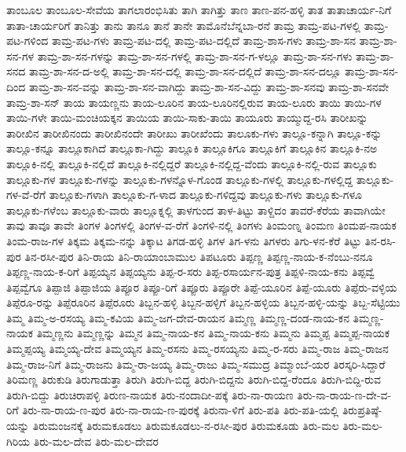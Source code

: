 {ತಾಂಬೂಲ
ತಾಂಬೂಲ-ಸೇವೆಯ
ತಾಗಲಾರಂಭಿಸಿತು
ತಾಗಿ
ತಾಗಿತ್ತು
ತಾಣ
ತಾಣ-ಪನ-ಹಳ್ಳಿ
ತಾತ
ತಾತಾಚಾರ್ಯ-ನಿಗೆ
ತಾತಾ-ಚಾರ್ಯರಿಗೆ
ತಾನಿತ್ತು
ತಾನು
ತಾನೂ
ತಾನೆ
ತಾನೇ
ತಾಮೊನೆಬೆನ್ನಬಾ-ರನೆ
ತಾಮ್ರ
ತಾಮ್ರ-ಪಟ-ಗಳಲ್ಲಿ
ತಾಮ್ರ-ಪಟ-ಗಳಿಂದ
ತಾಮ್ರ-ಪಟ-ಗಳು
ತಾಮ್ರ-ಪಟ-ದಲ್ಲಿ
ತಾಮ್ರ-ಪಟ-ದಲ್ಲಿದೆ
ತಾಮ್ರ-ಶಾಸ-ಗಳು
ತಾಮ್ರ-ಶಾ-ಸನ
ತಾಮ್ರ-ಶಾ-ಸನ-ಗಳ
ತಾಮ್ರ-ಶಾ-ಸನ-ಗಳನ್ನು
ತಾಮ್ರ-ಶಾ-ಸನ-ಗಳಲ್ಲಿ
ತಾಮ್ರ-ಶಾ-ಸನ-ಗ-ಳಲ್ಲೂ
ತಾಮ್ರ-ಶಾ-ಸನ-ಗಳು
ತಾಮ್ರ-ಶಾ-ಸನದ
ತಾಮ್ರ-ಶಾ-ಸನ-ದ-ಅಲ್ಲಿ
ತಾಮ್ರ-ಶಾ-ಸನ-ದಲ್ಲಿ
ತಾಮ್ರ-ಶಾ-ಸನ-ದಲ್ಲಿದೆ
ತಾಮ್ರ-ಶಾ-ಸನ-ದಲ್ಲೂ
ತಾಮ್ರ-ಶಾ-ಸನ-ದಿಂದ
ತಾಮ್ರ-ಶಾ-ಸನ-ವನ್ನು
ತಾಮ್ರ-ಶಾ-ಸನ-ವಾಗಿದ್ದು
ತಾಮ್ರ-ಶಾ-ಸನ-ವಿದ್ದು
ತಾಮ್ರ-ಶಾ-ಸನವು
ತಾಮ್ರ-ಶಾ-ಸನವೇ
ತಾಮ್ರ-ಶಾ-ಸನ್
ತಾಯ
ತಾಯಣ್ಣನು
ತಾಯ-ಲೂರಿನ
ತಾಯ-ಲೂರಿನಲ್ಲಿರುವ
ತಾಯ-ಲೂರು
ತಾಯಿ
ತಾಯಿ-ಗಳ
ತಾಯಿ-ಗಳೇ
ತಾಯಿ-ಮಂಚಿಯಕ್ಕನ
ತಾಯಿಯ
ತಾಯಿ-ಸಾಕು-ತಾಯಿ
ತಾಯೂರು
ತಾಯ್ಮುದ್ದ-ರಸಿ
ತಾರೀಖನ್ನು
ತಾರೀಖಿನ
ತಾರೀಖಿನಂದು
ತಾರೀಖಿನಂದೇ
ತಾರೀಖು
ತಾರೀಖೆಂದು
ತಾಲೂಕು-ಗಳು
ತಾಲ್ಲೂ-ಕನ್ನಾಗಿ
ತಾಲ್ಲೂ-ಕನ್ನು
ತಾಲ್ಲೂ-ಕನ್ನೂ
ತಾಲ್ಲೂಕಾಗಿದೆ
ತಾಲ್ಲೂಕಾ-ಗಿದ್ದು
ತಾಲ್ಲೂಕಿ
ತಾಲ್ಲೂಕಿಗೂ
ತಾಲ್ಲೂಕಿಗೆ
ತಾಲ್ಲೂಕಿನ
ತಾಲ್ಲೂಕಿ-ನಅ
ತಾಲ್ಲೂಕಿ-ನಲ್ಲಿ
ತಾಲ್ಲೂಕಿ-ನಲ್ಲಿದೆ
ತಾಲ್ಲೂಕಿ-ನಲ್ಲಿದ್ದರೆ
ತಾಲ್ಲೂಕಿ-ನಲ್ಲಿದ್ದ-ವೆಂದು
ತಾಲ್ಲೂಕಿ-ನಲ್ಲಿ-ರುವ
ತಾಲ್ಲೂಕು
ತಾಲ್ಲೂಕು-ಗಳ
ತಾಲ್ಲೂಕು-ಗಳನ್ನು
ತಾಲ್ಲೂಕು-ಗಳನ್ನೊಳ-ಗೊಂಡ
ತಾಲ್ಲೂಕು-ಗಳಲ್ಲಿ
ತಾಲ್ಲೂಕು-ಗಳಲ್ಲಿದ್ದ
ತಾಲ್ಲೂಕು-ಗಳ-ವೆ-ರೆಗೆ
ತಾಲ್ಲೂಕು-ಗಳಾಗಿ
ತಾಲ್ಲೂಕು-ಗ-ಳಾದ
ತಾಲ್ಲೂಕು-ಗಳಿದ್ದವು
ತಾಲ್ಲೂಕು-ಗಳು
ತಾಲ್ಲೂಕು-ಗಳೂ
ತಾಲ್ಲೂಕು-ಗಳೆಂಬ
ತಾಲ್ಲೂಕು-ವಾರು
ತಾಲ್ಲೂಕ್ನಲ್ಲಿ
ತಾಳಗುಂದ
ತಾಳ-ತಿಟ್ಟು
ತಾಳ್ದಿದಂ
ತಾವರೆ-ಕೆರೆಯ
ತಾವಾಗಿಯೇ
ತಾವು
ತಾವೂ
ತಾವೇ
ತಿಂಗಳ
ತಿಂಗಳಲ್ಲಿ
ತಿಂಗಳ-ವ-ರೆಗೆ
ತಿಂಗಳಿ-ನಲ್ಲಿ
ತಿಂಗಳು
ತಿಂಮಂಣ್ನ
ತಿಂಮಣ
ತಿಂಮಪ-ನಾಯಕ
ತಿಂಮ-ರಾಜ-ಗಳ
ತಿಕ್ಕಮ
ತಿಕ್ಕಮ-ನನ್ನು
ತಿಕ್ಕಾಟ
ತಿಗಡ-ಹಳ್ಳಿ
ತಿಗಳ
ತಿಗ-ಳನು
ತಿಗಳರು
ತಿಗು-ಳನ-ಕೆರೆ
ತಿಟ್ಟು
ತಿನ-ರಸಿ-ಪುರ
ತಿನ-ರಸೀ-ಪುರ
ತಿನಿ-ರಾಯ
ತಿನಿ-ರಾಯಾಂಬಾಮುಲ
ತಿಪಟೂರು
ತಿಪ್ಪಣ್ಣ
ತಿಪ್ಪಣ್ಣ-ನಾಯ-ಕ-ನೆಂಬು-ನನೂ
ತಿಪ್ಪಣ್ಣ-ನಾಯ-ಕ-ರಿಗೆ
ತಿಪ್ಪಯ್ಯನ
ತಿಪ್ಪಯ್ಯನು
ತಿಪ್ಪ-ರ-ಸರು
ತಿಪ್ಪ-ರಸಾರ್ಯನ-ಪುತ್ರ
ತಿಪ್ಪಳಿ-ನಾಯ-ಕನು
ತಿಪ್ಪವ್ವೆ
ತಿಪ್ಪವ್ವೆಗೂ
ತಿಪ್ಪಾಜಿ
ತಿಪ್ಪಾಜಿಯ
ತಿಪ್ಪೂರ
ತಿಪ್ಪೂ-ರಿಗೆ
ತಿಪ್ಪೂರು
ತಿಪ್ಪೂರೇ
ತಿಪ್ಪೆ-ಯೂರಿನ
ತಿಪ್ಪೆ-ಯೂರು
ತಿಪ್ಪೆರು-ವಳ್ಳಿಯ
ತಿಪ್ಪೆರೂ-ರನ್ನು
ತಿಪ್ಪೆರೂರಿನ
ತಿಪ್ಪೆರೂರು
ತಿಬ್ಬನ-ಹಳ್ಳಿ
ತಿಬ್ಬನ-ಹಳ್ಳಿಗೆ
ತಿಬ್ಬನ-ಹಳ್ಳಿಯ
ತಿಬ್ಬನ-ಹಳ್ಳಿ-ಯನ್ನು
ತಿಬ್ಬ-ಸೆಟ್ಟಿಯು
ತಿಮ್ಮ
ತಿಮ್ಮ-ಅ-ರಸಯ್ಯ
ತಿಮ್ಮ-ಕವಿಯ
ತಿಮ್ಮ-ಜಗ-ದೇವ-ರಾಯನ
ತಿಮ್ಮಣ್ಣ
ತಿಮ್ಮಣ್ಣ-ದಂಡ-ನಾಯ-ಕನ
ತಿಮ್ಮಣ್ಣ-ನಾಯಕ
ತಿಮ್ಮಣ್ಣನು
ತಿಮ್ಮಣ್ಣನ್ನು
ತಿಮ್ಮನ
ತಿಮ್ಮ-ನಾಯ-ಕನ
ತಿಮ್ಮ-ನಾಯ-ಕನು
ತಿಮ್ಮನು
ತಿಮ್ಮಪ್ಪ
ತಿಮ್ಮಪ್ಪ-ನಾಯಕ
ತಿಮ್ಮಪ್ಪಯ್ಯ
ತಿಮ್ಮಯ್ಯ-ದೇವ
ತಿಮ್ಮಯ್ಯನ
ತಿಮ್ಮ-ರಸನು
ತಿಮ್ಮ-ರಸಯ್ಯನು
ತಿಮ್ಮ-ರ-ಸರು
ತಿಮ್ಮ-ರಾಜ
ತಿಮ್ಮ-ರಾಜನ
ತಿಮ್ಮ-ರಾಜ-ನಿಗೆ
ತಿಮ್ಮ-ರಾಜನು
ತಿಮ್ಮ-ರಾ-ಜಯ್ಯ
ತಿಮ್ಮ-ರಾಜು
ತಿಮ್ಮ-ಸಮುದ್ರ
ತಿಮ್ಮಾಂಬೆ-ಯರ
ತಿರಸ್ಕರಿ-ಸಿದ್ದಾರೆ
ತಿರಿಮಣ್ಣ
ತಿರುಕುಡಿ
ತಿರುಗಾಡುತ್ತಾ
ತಿರುಗಿ
ತಿರುಗಿ-ಬಿದ್ದ
ತಿರುಗಿ-ಬಿದ್ದನು
ತಿರುಗಿ-ಬಿದ್ದ-ರೆಂದೂ
ತಿರುಗಿ-ಬಿದ್ದಿ-ರುವ
ತಿರುಗಿ-ಬಿದ್ದು
ತಿರುಚಿರಾಪಳ್ಳಿ
ತಿರುಣ-ನಾಯಕ
ತಿರು-ನಂದಾದೀ-ಪಕ್ಕೆ
ತಿರು-ನಾ-ರಾಯಣ
ತಿರು-ನಾ-ರಾಯ-ಣ-ದೇ-ವ-ರಿಗೆ
ತಿರು-ನಾ-ರಾಯ-ಣ-ಪುರ
ತಿರು-ನಾ-ರಾಯ-ಣ-ಪುರಕ್ಕೆ
ತಿರುನಾ-ಳಿಗೆ
ತಿರು-ಪತಿ
ತಿರು-ಪತಿ-ಯಲ್ಲಿ
ತಿರುಪ್ರತಿಷ್ಠೆ-ಯನ್ನು
ತಿರುಮಂಜನಕ್ಕೆ
ತಿರುಮಕೂಡಲು
ತಿರುಮಕೂಡಲು-ನ-ರಸೀ-ಪುರ
ತಿರುಮಕೂಡು
ತಿರು-ಮಲ
ತಿರು-ಮಲ-ಗಿರಿಯ
ತಿರು-ಮಲ-ದೇವ
ತಿರು-ಮಲ-ದೇವರ
}
